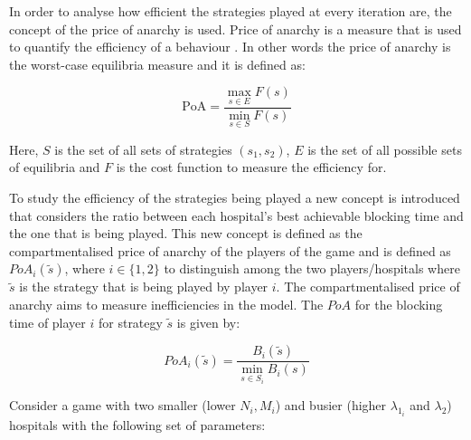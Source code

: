 In order to analyse how efficient the strategies played at every iteration are, 
the concept of the price of anarchy is used.
Price of anarchy is a measure that is used to quantify the efficiency of a
behaviour \cite{roughgarden2005selfish}.
In other words the price of anarchy is the worst-case equilibria measure and it 
is defined as:

\begin{equation}\label{eq:general_price_of_anarchy}
    \text{PoA} = \frac{\max_{s \in E} F(s)}{\min_{s \in S} F(s)}
\end{equation}

Here, \(S\) is the set of all sets of strategies \((s_1, s_2)\), \(E\) is the 
set of all possible sets of equilibria and \(F\) is the cost function to 
measure the efficiency for. 

To study the efficiency of the strategies being played a new concept is 
introduced that considers the ratio between each hospital's best achievable 
blocking time and the one that is being played.
This new concept is defined as the compartmentalised price of anarchy of the 
players of the game and is defined as \(PoA_i(\tilde{s})\), where 
\(i \in \{1, 2\}\) to distinguish among the two players/hospitals where 
\(\tilde{s}\) is the strategy that is being played by player \( i \). 
The compartmentalised price of anarchy aims to measure inefficiencies in the 
model.
The \(PoA\) for the blocking time of player \(i\) for strategy \(\tilde{s}\) 
is given by:

\begin{equation}\label{eq:poa_compartmentalised}
    PoA_{i}(\tilde{s}) = \frac{B_i(\tilde{s})}{\min_{s \in S_i} B_i(s)}
\end{equation}

Consider a game with two smaller (lower \( N_i, M_i \)) and busier (higher 
\(\lambda_{1_i} \) and \(\lambda_2\)) hospitals with the following set of 
parameters:

